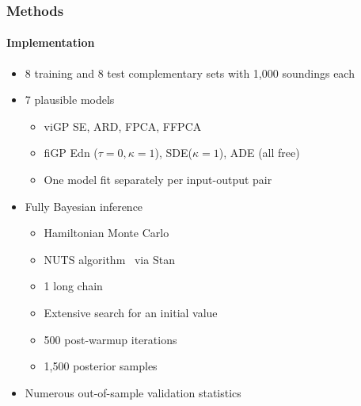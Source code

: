 \documentclass{snedecorbeamer}
\begin{document}
\begin{frame}
  \frametitle{Methods}
  \framesubtitle{Implementation}

  \begin{itemize}
  \item 8 training and 8 test complementary sets with 1,000 soundings each
  \item 7 plausible models
    \begin{itemize}
    \item viGP SE, ARD, FPCA, FFPCA
    \item fiGP Edn ($\tau=0,\kappa=1$), SDE($\kappa=1$), ADE (all free)
    \item One model fit separately per input-output pair
    \end{itemize}
  \item Fully Bayesian inference
    \begin{itemize}
    \item Hamiltonian Monte Carlo~\cite[ch. 5]{brooks2011}
    \item NUTS algorithm~\cite{hoffman2014} via
      Stan~\cite{standevelopmentteam2021}
    \item 1 long chain~\cite{raftery1992}
    \item Extensive search for an initial value
    \item 500 post-warmup iterations
    \item 1,500 posterior samples
    \end{itemize}
  \item \hyperlink{frm:validation}{}
    Numerous out-of-sample validation statistics
  \end{itemize}
\end{frame}
\end{document}
